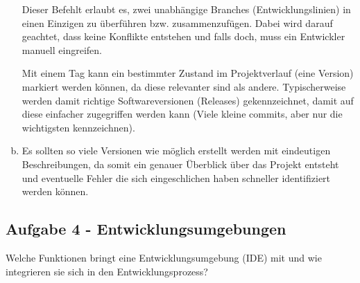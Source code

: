 \begin{loesung}
\begin{enumerate}[(a)]
                \begin{highlighting}[Merge]
                    Dieser Befehlt erlaubt es, zwei unabhängige Branches (Entwicklungslinien) in einen Einzigen zu überführen bzw. zusammenzufügen. Dabei wird darauf geachtet, dass keine Konflikte entstehen und falls doch, muss ein Entwickler manuell eingreifen.
                \end{highlighting}
            
                \begin{highlighting}[Tags]
                    Mit einem Tag kann ein bestimmter Zustand im Projektverlauf (eine Version) markiert werden können, da diese relevanter sind als andere. Typischerweise werden damit richtige Softwareversionen (Releases) gekennzeichnet, damit auf diese einfacher zugegriffen werden kann (Viele kleine commits, aber nur die wichtigsten kennzeichnen).
                \end{highlighting}
            
                \item Es sollten so viele Versionen wie möglich erstellt werden mit eindeutigen Beschreibungen, da somit ein genauer Überblick über das Projekt entsteht und eventuelle Fehler die sich eingeschlichen haben schneller identifiziert werden können.
            \end{enumerate}
        \end{loesung}
	
    
	\subsection{Aufgabe 4 - Entwicklungsumgebungen}
    
        \begin{aufgabe}
            Welche Funktionen bringt eine Entwicklungsumgebung (IDE) mit und wie integrieren sie sich in den Entwicklungsprozess?
        \end{aufgabe}
    
